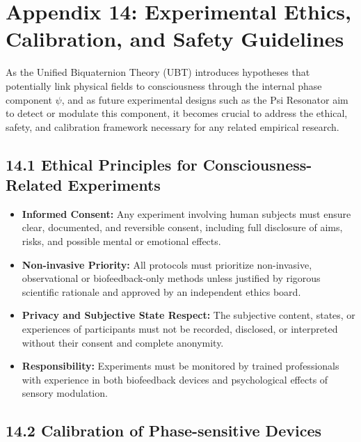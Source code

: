 
\section*{Appendix 14: Experimental Ethics, Calibration, and Safety Guidelines}


\ConsciousnessDisclaimer

As the Unified Biquaternion Theory (UBT) introduces hypotheses that potentially link physical fields to consciousness through the internal phase component \(\psi\), and as future experimental designs such as the Psi Resonator aim to detect or modulate this component, it becomes crucial to address the ethical, safety, and calibration framework necessary for any related empirical research.

\subsection*{14.1 Ethical Principles for Consciousness-Related Experiments}

\begin{itemize}
  \item \textbf{Informed Consent:} Any experiment involving human subjects must ensure clear, documented, and reversible consent, including full disclosure of aims, risks, and possible mental or emotional effects.
  \item \textbf{Non-invasive Priority:} All protocols must prioritize non-invasive, observational or biofeedback-only methods unless justified by rigorous scientific rationale and approved by an independent ethics board.
  \item \textbf{Privacy and Subjective State Respect:} The subjective content, states, or experiences of participants must not be recorded, disclosed, or interpreted without their consent and complete anonymity.
  \item \textbf{Responsibility:} Experiments must be monitored by trained professionals with experience in both biofeedback devices and psychological effects of sensory modulation.
\end{itemize}

\subsection*{14.2 Calibration of Phase-sensitive Devices}

